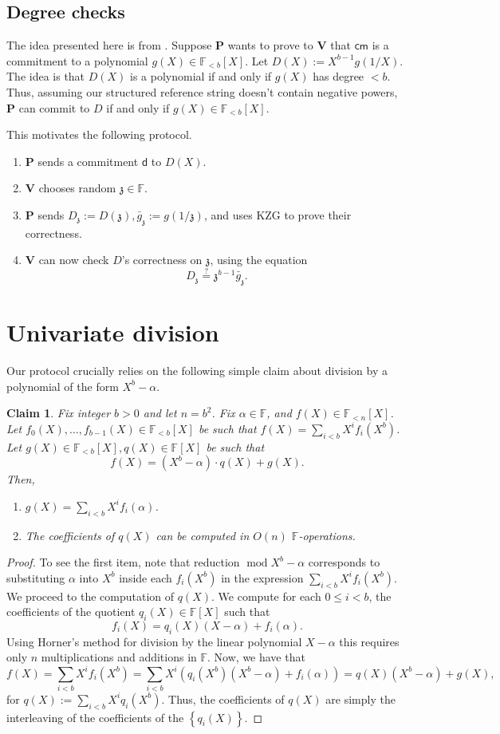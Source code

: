 \documentclass[11pt]{article} %
\newcommand{\F}{\ensuremath{\mathbb F}\xspace}
\newcommand{\cm}{\ensuremath{\mathsf{cm}}\xspace}
\newcommand{\defeq}{:=}
\renewcommand{\mod}{\ensuremath{\;\mathrm{mod}\;}}
\newcommand{\prv}{\ensuremath{\mathsf{\mathbf{P}}}\xspace}
\newcommand{\ver}{\ensuremath{\mathsf{\mathbf{V}}}\xspace}
\newcommand{\set}[1]{\ensuremath{\left\{#1\right\}}\xspace}
\newcommand{\polysofdeg}[1]{\ensuremath{\F_{< #1}[X]}\xspace}
\newcommand{\polys}{\ensuremath{\F[X]}\xspace}
\newcommand{\sumi}[1]{\sum_{i< #1}}
\newtheorem{claim}[lemma]{Claim}
\renewcommand{\d}{\ensuremath{\mathsf{d}}\xspace}
\renewcommand{\zeta}{\mathfrak{z}}
\newcommand{\dzeta}{\ensuremath{D_{\zeta}}\xspace}
\newcommand{\ginv}{\ensuremath{\bar{g}_{\zeta}}\xspace}
\begin{document}
\subsection{Degree checks}
The idea presented here is from \cite{thakur}.
Suppose \prv wants to prove to \ver that \cm is a commitment to a polynomial $g(X)\in \polysofdeg{b}$.
Let $D(X)\defeq  X^{b-1} g(1/X)$. The idea is that $D(X)$ is a polynomial if and only if $g(X)$ has degree $<b$.
Thus, assuming our structured reference string  doesn't contain negative powers, \prv can commit to $D$ if
and only if $g(X)\in \polysofdeg{b}$.

This motivates the following protocol.
\begin{enumerate}
 \item 
\prv sends a commitment \d to $D(X)$.
\item \ver chooses random $\zeta \in \F$.
\item \prv sends $\dzeta \defeq D(\zeta), \ginv \defeq  g(1/\zeta)$, and uses KZG to prove their correctness.
\item \ver can now check $D$'s correctness on   $\zeta$, using the equation
\[\dzeta \stackrel{?}{=}\zeta^{b-1} \ginv.\]

\end{enumerate}

\section{Univariate division}

Our protocol crucially relies on the following simple claim about division by a polynomial of the form
$X^b-\alpha$.
\begin{claim}\label{clm:univariatemod}
 Fix integer $b>0$ and let $n=b^2$. Fix $\alpha\in \F$, and $f(X)\in \polysofdeg{n}$.
Let $f_0(X),\ldots,f_{b-1}(X)\in \polysofdeg{b}$ be such that
$f(X)=\sumi{b}X^i f_i(X^b)$.
 Let $g(X)\in \polysofdeg{b},q(X)\in \polys$ be such that 
 \[f(X)=(X^b-\alpha)\cdot q(X) + g(X).\]
 Then,
 \begin{enumerate}
  \item $g(X)=\sumi{b} X^i f_i(\alpha)$.
  \item The coefficients of $q(X)$ can be computed in $O(n)$ \F-operations.
 \end{enumerate}

\end{claim}
\begin{proof}
To see the first item, note that reduction $\mod X^b-\alpha$ corresponds to substituting $\alpha$ into $X^b$ inside each $f_i(X^b)$ in the expression $\sumi{b}X^i f_i(X^b)$.
We proceed to the computation of $q(X)$.
 We compute for each $0\leq i <b$, the coefficients of the quotient $q_i(X)\in \polys$ such that
\[f_i(X)=q_i(X)(X-\alpha)+ f_i(\alpha).\]
 Using Horner's method for division by the linear polynomial $X-\alpha$ this requires only $n$ multiplications and additions in \F.
Now, we have that
\[f(X)=\sumi{b}X^i f_i(X^b) = \sumi{b} X^i \left(q_i(X^b)(X^b-\alpha)+f_i(\alpha)\right)= q(X)(X^b-\alpha) + g(X),\]
for $q(X)\defeq \sumi{b}X^i q_i(X^b)$.
Thus, the coefficients of $q(X)$ are simply the interleaving of the coefficients of the \set{q_i(X)}.
\end{proof}
\end{document}
